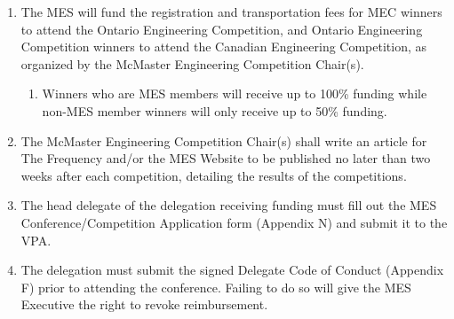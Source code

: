 \begin{enumerate}
  \begin{enumerate}
   \item
    The MES will fund the registration and transportation fees for MEC
    winners to attend the Ontario Engineering Competition, and Ontario
    Engineering Competition winners to attend the Canadian Engineering
    Competition, as organized by the McMaster Engineering Competition
    Chair(s).

    \begin{enumerate}
     \item
      Winners who are MES members will receive up to 100\% funding while
      non-MES member winners will only receive up to 50\% funding.
    \end{enumerate}
   \item
    The McMaster Engineering Competition Chair(s) shall write an article
    for The Frequency and/or the MES Website to be published no later
    than two weeks after each competition, detailing the results of the
    competitions.
   \item
    The head delegate of the delegation receiving funding must fill out
    the MES Conference/Competition Application form (Appendix N) and
    submit it to the VPA.
   \item
    The delegation must submit the signed Delegate Code of Conduct
    (Appendix F) prior to attending the conference. Failing to do so
    will give the MES Executive the right to revoke reimbursement.

  \end{enumerate}
\end{enumerate}

